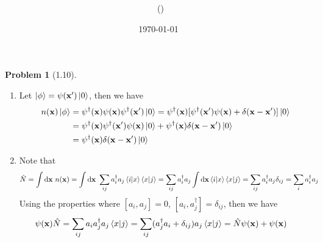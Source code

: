 \documentclass[twoside,11pt]{article}
\title{{\lms \Code \ \Ass}}
\author{\lms \name \ (\href{mailto:\mail}{\mail})}
\date{\sffamily \today}
\makeatletter
\renewcommand*\d{\mathop{}\!\mathrm{d}}
\theoremstyle{definition}
\newtheorem{problem}{Problem}
\theoremstyle{remark}
\newtheorem*{remark}{Remark}
\renewcommand{\maketitle}{\bgroup\setlength{\parindent}{0pt}
\begin{flushleft}
  \textbf{\Large\@title}

  \@author
\end{flushleft}\egroup
}
\makeatother
\begin{document}
\maketitle
\thispagestyle{title}


\begin{problem}[1.10]\
\begin{enumerate}[label=(\alph*)]
\item Let $\ket{\phi}=\psi(\mathbf{x}')\ket{0}$, then we have
\begin{align*}
    n(\mathbf{x})\ket{\phi} &= 
    \psi^\dagger(\mathbf{x})\psi(\mathbf{x})
    \psi^\dagger(\mathbf{x}')\ket{0}
    = \psi^\dagger(\mathbf{x})[
        \psi^\dagger(\mathbf{x}')\psi(\mathbf{x})
        + \delta(\mathbf{x}-\mathbf{x}')
    ]\ket{0}\\
    &= \psi^\dagger(\mathbf{x})\psi^\dagger(\mathbf{x}')\psi(\mathbf{x})\ket{0}
    + \psi^\dagger(\mathbf{x})\delta(\mathbf{x}-\mathbf{x}')\ket{0}\\
    &= \psi^\dagger(\mathbf{x})\delta(\mathbf{x}-\mathbf{x}')\ket{0}
\end{align*}

\item Note that
\begin{align*}
    \hat{N} &= 
    \int\d\mathbf{x}\ n(\mathbf{x})
    = \int\d\mathbf{x}\ \sum_{ij} a_i^\dagger a_j\braket{i|x}\braket{x|j}
    = \sum_{ij} a_i^\dagger a_j\int\d\mathbf{x}\braket{i|x}\braket{x|j}
    = \sum_{ij} a_i^\dagger a_j\delta_{ij}
    = \sum_i a_i^\dagger a_j
\end{align*}
Using the properties where $[a_i, a_j]=0$, $[a_i, a_j^\dagger]=\delta_{ij}$,
then we have
\begin{align*}
    \psi(\mathbf{x})\hat{N} &= 
    \sum_{ij}a_ia_j^\dagger a_j\braket{x|j}
    = \sum_{ij}(a_j^\dagger a_i + \delta_{ij})a_j\braket{x|j}
    = \hat{N}\psi(\mathbf{x}) + \psi(\mathbf{x})
\end{align*}

\end{enumerate}
\end{problem}
\end{document}
